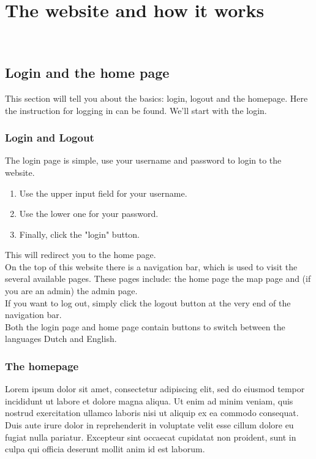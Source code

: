 \documentclass[a4paper]{article}
\begin{document}
\pagebreak

\section{The website and how it works}
~\\

\subsection{Login and the home page}
This section will tell you about the basics: login, logout and the homepage. Here the instruction for logging in can be found. We'll start with the login.
~\\

\subsubsection{Login and Logout}
The login page is simple, use your username and password to login to the website.

\begin{enumerate}
\item Use the upper input field for your username.
\item Use the lower one for your password.
\item Finally, click the "login" button.
\end{enumerate}

\noindent
This will redirect you to the home page.
\\
On the top of this website there is a navigation bar, which is used to visit the several available pages. These pages include: the home page the map page and (if you are an admin) the admin page.
\\
If you want to log out, simply click the logout button at the very end of the navigation bar.
\\
Both the login page and home page contain buttons to switch between the languages Dutch and English.
~\\

\subsubsection{The homepage}
Lorem ipsum dolor sit amet, consectetur adipiscing elit, sed do eiusmod tempor incididunt ut labore et dolore magna aliqua. Ut enim ad minim veniam, quis nostrud exercitation ullamco laboris nisi ut aliquip ex ea commodo consequat. Duis aute irure dolor in reprehenderit in voluptate velit esse cillum dolore eu fugiat nulla pariatur. Excepteur sint occaecat cupidatat non proident, sunt in culpa qui officia deserunt mollit anim id est laborum.
% 
% 
\end{document}
